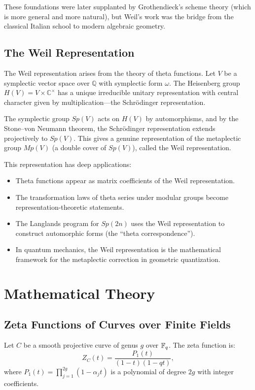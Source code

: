 These foundations were later supplanted by Grothendieck's scheme theory (which is more general and more natural), but Weil's work was the bridge from the classical Italian school to modern algebraic geometry.

\subsection{The Weil Representation}

The Weil representation arises from the theory of theta functions. Let $V$ be a symplectic vector space over $\mathbb{Q}$ with symplectic form $\omega$. The Heisenberg group $H(V) = V \times \mathbb{C}^\times$ has a unique irreducible unitary representation with central character given by multiplication---the Schr\"{o}dinger representation.

The symplectic group $Sp(V)$ acts on $H(V)$ by automorphisms, and by the Stone--von Neumann theorem, the Schr\"{o}dinger representation extends projectively to $Sp(V)$. This gives a genuine representation of the metaplectic group $Mp(V)$ (a double cover of $Sp(V)$), called the Weil representation.

This representation has deep applications:
\begin{itemize}
    \item Theta functions appear as matrix coefficients of the Weil representation.
    \item The transformation laws of theta series under modular groups become representation-theoretic statements.
    \item The Langlands program for $Sp(2n)$ uses the Weil representation to construct automorphic forms (the ``theta correspondence'').
    \item In quantum mechanics, the Weil representation is the mathematical framework for the metaplectic correction in geometric quantization.
\end{itemize}

\section{Mathematical Theory}

\subsection{Zeta Functions of Curves over Finite Fields}

Let $C$ be a smooth projective curve of genus $g$ over $\mathbb{F}_q$. The zeta function is:
\[
Z_C(t) = \frac{P_1(t)}{(1-t)(1-qt)},
\]
where $P_1(t) = \prod_{j=1}^{2g} (1 - \alpha_j t)$ is a polynomial of degree $2g$ with integer coefficients.

